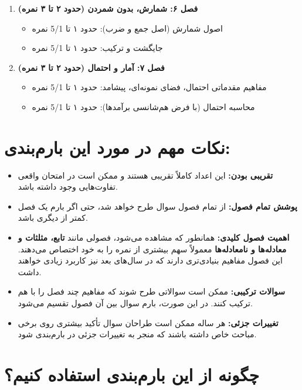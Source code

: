 \documentclass[12pt,a4paper]{article}
\begin{document}
\begin{enumerate}[label=\textbf{\arabic*.}, wide, labelindent=0pt]
    \item \textbf{فصل ۶: شمارش، بدون شمردن (حدود ۲ تا ۳ نمره)}
    \begin{itemize}
        \item اصول شمارش (اصل جمع و ضرب): حدود ۱ تا 5/1 نمره
        \item جایگشت و ترکیب: حدود ۱ تا 5/1 نمره
    \end{itemize}

    \item \textbf{فصل ۷: آمار و احتمال (حدود ۲ تا ۳ نمره)}
    \begin{itemize}
        \item مفاهیم مقدماتی احتمال، فضای نمونه‌ای، پیشامد: حدود ۱ تا 5/1 نمره
        \item محاسبه احتمال (با فرض هم‌شانسی برآمدها): حدود ۱ تا 5/1 نمره
    \end{itemize}
\end{enumerate}

\section*{نکات مهم در مورد این بارم‌بندی:}

\begin{itemize}
    \item \textbf{تقریبی بودن:} این اعداد کاملاً تقریبی هستند و ممکن است در امتحان واقعی تفاوت‌هایی وجود داشته باشد.
    \item \textbf{پوشش تمام فصول:} از تمام فصول سوال طرح خواهد شد، حتی اگر بارم یک فصل کمتر از دیگری باشد.
    \item \textbf{اهمیت فصول کلیدی:} همانطور که مشاهده می‌شود، فصولی مانند \textbf{تابع، مثلثات و معادله‌ها و نامعادله‌ها} معمولاً سهم بیشتری از نمره را به خود اختصاص می‌دهند. این فصول مفاهیم بنیادی‌تری دارند که در سال‌های بعد نیز کاربرد زیادی خواهند داشت.
    \item \textbf{سوالات ترکیبی:} ممکن است سوالاتی طرح شوند که مفاهیم چند فصل را با هم ترکیب کنند. در این صورت، بارم سوال بین آن فصول تقسیم می‌شود.
    \item \textbf{تغییرات جزئی:} هر ساله ممکن است طراحان سوال تأکید بیشتری روی برخی مباحث خاص داشته باشند که منجر به تغییرات جزئی در بارم‌بندی شود.
\end{itemize}

\section*{چگونه از این بارم‌بندی استفاده کنیم؟}
\end{document}
